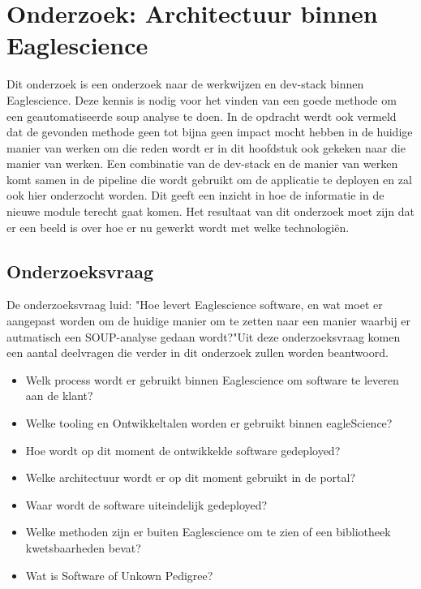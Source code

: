 \chapter{Onderzoek: Architectuur binnen Eaglescience}\label{ch:onderzoek:-architectuur-binnen-eaglescience} %

Dit onderzoek is een onderzoek naar de werkwijzen en dev-stack binnen Eaglescience.
Deze kennis is nodig voor het vinden van een goede methode om een geautomatiseerde soup analyse te doen.
In de opdracht werdt ook vermeld dat de gevonden methode geen tot bijna geen impact mocht hebben in de huidige manier van werken om die reden wordt er in dit hoofdstuk ook gekeken naar die manier van werken.
Een combinatie van de dev-stack en de manier van werken komt samen in de pipeline die wordt gebruikt om de applicatie te deployen en zal ook hier onderzocht worden.
Dit geeft een inzicht in hoe de informatie in de nieuwe module terecht gaat komen.
Het resultaat van dit onderzoek moet zijn dat er een beeld is over hoe er nu gewerkt wordt met welke technologiën.

\section{Onderzoeksvraag}\label{sec:onderzoeksvraag}
De onderzoeksvraag luid: "Hoe levert Eaglescience software, en wat moet er aangepast worden om de huidige manier om te zetten naar een manier waarbij er autmatisch een SOUP-analyse gedaan wordt?"\@ Uit deze onderzoeksvraag komen een aantal deelvragen die verder in dit onderzoek zullen worden beantwoord.

\begin{itemize}
  \item Welk process wordt er gebruikt binnen Eaglescience om software te leveren aan de klant?
  \item Welke tooling en Ontwikkeltalen worden er gebruikt binnen eagleScience?
  \item Hoe wordt op dit moment de ontwikkelde software gedeployed?
  \item Welke architectuur wordt er op dit moment gebruikt in de portal?
  \item Waar wordt de software uiteindelijk gedeployed?
  \item Welke methoden zijn er buiten Eaglescience om te zien of een bibliotheek kwetsbaarheden bevat?
  \item Wat is Software of Unkown Pedigree?
\end{itemize}

